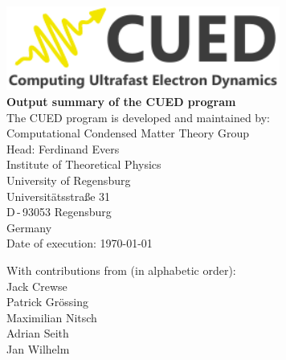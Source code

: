 \documentclass[11pt, a4paper]{scrartcl}
\begin{document}

\begin{titlepage}
  \sffamily
  \begin{center}
{
\includegraphics[width=9cm]{logo.pdf}
\\[5em]
\Huge \bfseries Output summary of the CUED program}
\\[3em]\large
The CUED program is developed and maintained by:
\\[3em]
Computational Condensed Matter Theory Group
\\[0.5em]
Head: Ferdinand Evers
  \\[0.5em]
Institute of Theoretical Physics
  \\[0.5em]
University of Regensburg
  \\[0.5em]
Universitätsstraße 31
  \\[0.5em]
D\,-\,93053 Regensburg
  \\[0.5em]
Germany
\\[3em]
Date of execution: \today
\\[3em]
  \end{center}{\large
  With contributions from (in alphabetic order): 
  \\[1em]
  Jack Crewse
  \\[0.5em]
  Patrick Grössing
  \\[0.5em]
  Maximilian Nitsch
  \\[0.5em]
  Adrian Seith
  \\[0.5em]
  Jan Wilhelm
  }
\end{titlepage}







\pagestyle{plain}




\tableofcontents


\pagestyle{fancy}
\end{document}
